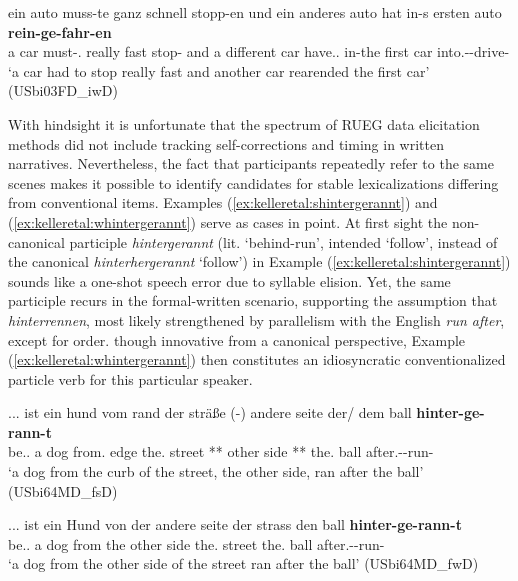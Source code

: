 \documentclass[output=paper,colorlinks,citecolor=brown]{langscibook}
\begin{document}
\ex \label{ex:kelleretal:stoppen}
\gll ein auto muss-te ganz schnell stopp-en und ein anderes auto hat in-s ersten auto \textbf{rein-ge-fahr-en}\\
a car must-\Pst.\Tsg{} really fast stop-\Inf{} and a different car have.\Prs.\Tsg{} in-the first car into.\Vpart{}-\Ptcp{}-drive-\Ptcp{} \\
\glt `a car had to stop really fast and another car rearended the first car' (USbi03FD\_iwD)
\z

With hindsight it is unfortunate that the spectrum of RUEG data elicitation methods did not include tracking self-corrections and timing in written narratives. Nevertheless, the fact that participants repeatedly refer to the same scenes makes it possible to identify candidates for stable lexicalizations differing from conventional items. Examples (\ref{ex:kelleretal:shintergerannt}) and (\ref{ex:kelleretal:whintergerannt}) serve as cases in point. At first sight the non-canonical participle \textit{hintergerannt} (lit. `behind-run', intended `follow', instead of the canonical \textit{hinterhergerannt} `follow') in Example (\ref{ex:kelleretal:shintergerannt}) sounds like a one-shot speech error due to syllable elision. Yet, the same participle recurs in the formal-written scenario, supporting the assumption that \textit{hinterrennen}, most likely strengthened by parallelism with the English \textit{run after}, except for order. though innovative from a canonical perspective, Example (\ref{ex:kelleretal:whintergerannt}) then constitutes an idiosyncratic conventionalized particle verb for this particular speaker.

\ea
\label{ex:kelleretal:shintergerannt}
\gll ... ist ein hund vom rand der sträße (-) andere seite der/ dem ball \textbf{hinter-ge-rann-t} \\
{} be.\Prs.\Tsg{} a dog from.\Dat{} edge the.\Gen{} street {**} other side {**} the.\Dat{} ball after.\Vpart-\Ptcp{}-run-\Ptcp{} \\
\glt `a dog from the curb of the street, the other side, ran after the ball' (USbi64MD\_fsD) 
    
\ex \label{ex:kelleretal:whintergerannt}
\gll ... ist ein Hund von der andere seite der strass den ball \textbf{hinter-ge-rann-t} \\
{} be.\Prs.\Tsg{} a dog from the other side the.\Gen{} street the.\Acc{} ball after.\Vpart-\Ptcp{}-run-\Ptcp{} \\
\glt `a dog from the other side of the street ran after the ball' (USbi64MD\_fwD) 
\z
\end{document}
